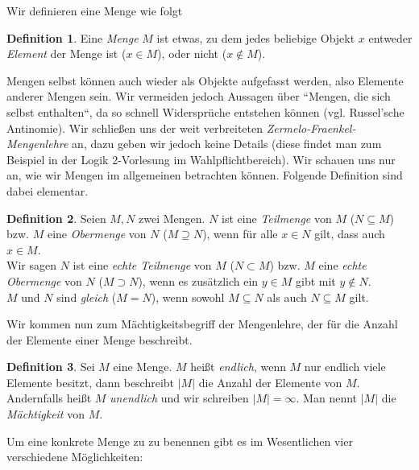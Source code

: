\documentclass[11pt, a4paper]{article}
\theoremstyle{definition}
\newtheorem{definition}{Definition}[section]
\theoremstyle{plain}
\numberwithin{equation}{section}
\begin{document}
Wir definieren eine Menge wie folgt
\begin{definition}
	Eine \textit{Menge} \( M \) ist etwas, zu dem jedes beliebige Objekt \( x \) entweder \textit{Element} der Menge ist (\( x \in M \)), oder nicht (\( x \notin M \)).
\end{definition}
Mengen selbst können auch wieder als Objekte aufgefasst werden, also Elemente anderer Mengen sein. Wir vermeiden jedoch Aussagen über ``Mengen, die sich selbst enthalten``, da so schnell Widersprüche entstehen können (vgl. Russel'sche Antinomie). Wir schließen uns der weit verbreiteten \textit{Zermelo-Fraenkel-Mengenlehre} an, dazu geben wir jedoch keine Details (diese findet man zum Beispiel in der Logik 2-Vorlesung im Wahlpflichtbereich). Wir schauen uns nur an, wie wir Mengen im allgemeinen betrachten können. Folgende Definition sind dabei elementar.
\begin{definition}\label{def:subsets}
	Seien \( M, N \) zwei Mengen. \( N \) ist eine \textit{Teilmenge} von \( M \) (\( N \subseteq M \)) bzw. \( M \) eine \textit{Obermenge} von \( N \) (\( M \supseteq N \)), wenn für alle \( x \in N \) gilt, dass auch \( x \in M \).\\
	Wir sagen \( N \) ist eine \textit{echte Teilmenge} von \( M \) (\( N \subset M \)) bzw. \( M \) eine \textit{echte Obermenge} von \( N \) (\( M \supset N \)), wenn es zusätzlich ein \( y \in M \) gibt mit \( y \notin N \).\\
	\( M \) und \( N \) sind \textit{gleich} (\( M = N \)), wenn sowohl \( M \subseteq N \) als auch \( N \subseteq M \) gilt.
\end{definition}
Wir kommen nun zum Mächtigkeitsbegriff der Mengenlehre, der für die Anzahl der Elemente einer Menge beschreibt.
\begin{definition}
	Sei \( M \) eine Menge. \( M \) heißt \textit{endlich}, wenn \( M \) nur endlich viele Elemente besitzt, dann beschreibt \( \left| M \right| \) die Anzahl der Elemente von \( M \). Andernfalls heißt \( M \) \textit{unendlich} und wir schreiben \( \left| M \right| = \infty \). Man nennt \( \left| M \right| \) die \textit{Mächtigkeit} von \( M \).
\end{definition}
Um eine konkrete Menge zu zu benennen gibt es im Wesentlichen vier verschiedene Möglichkeiten:
\end{document}
